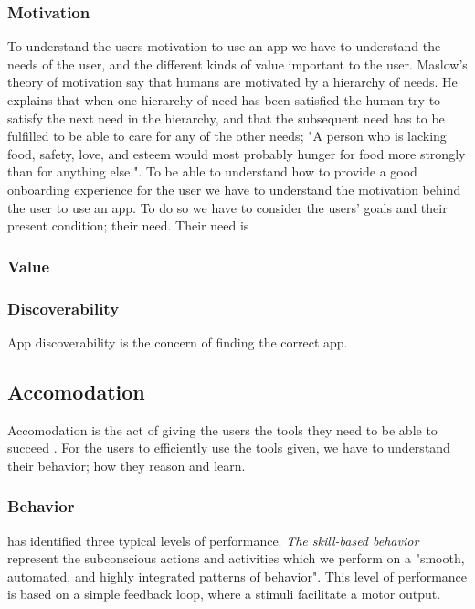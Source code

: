\subsubsection{Motivation}
To understand the users motivation to use an app we have to understand the needs of the user, and the different kinds of value important to the user. Maslow’s theory of motivation \cite{Maslow1943} say that humans are motivated by a hierarchy of needs. He explains that when one hierarchy of need has been satisfied the human try to satisfy the next need in the hierarchy, and that the subsequent need has to be fulfilled to be able to care for any of the other needs; "A person who is lacking food, safety, love, and esteem would most probably hunger for food more strongly than for anything else.". To be able to understand how to provide a good onboarding experience for the user we have to understand the motivation behind the user to use an app. To do so we have to consider the users’ goals and their present condition; their need. Their need is

\subsubsection{Value}

\subsubsection{Discoverability}
App discoverability is the concern of finding the correct app. 

\subsection{Accomodation}
Accomodation is the act of giving the users the tools they need to be able to succeed \cite{Bradt2009}. For the users to efficiently use the tools given, we have to understand their behavior; how they reason and learn.

\subsubsection{Behavior}
\cite{Rasmussen1983} has identified three typical levels of performance. \textit{The skill-based behavior} represent the subconscious actions and activities which we perform on a "smooth, automated, and highly integrated patterns of behavior". This level of performance is based on a simple feedback loop, where a stimuli facilitate a motor output. 

